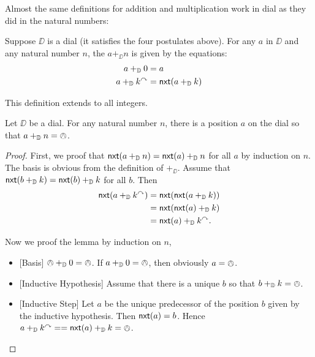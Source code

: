 Almost the same definitions for addition and multiplication work in dial as they did in the natural numbers:

\begin{defn}
	Suppose $\DD$ is a dial (it satisfies the four postulates above). For any $a$ in $\DD$ and any natural number $n$, the  $a+_\DD n$ is given by the equations:
	\begin{align*}
		a +_{\mathbb D} 0 &= a\\
		a +_{\mathbb D} k^\curvearrowright &= {\mathord{\textsf{nxt}}}(a+_{\mathbb D} k)
	\end{align*}
\end{defn}

This definition extends to all integers.

\begin{lem}
	Let $\DD$ be a dial.
	For any natural number $n$, there is a position $a$ on the dial so that $a+_{\mathbb D} n = \owedge$.
	
	\begin{proof}
		First, we proof that ${\mathord{\textsf{nxt}}}(a +_{\mathbb D} n) = {\mathord{\textsf{nxt}}}(a) +_{\mathbb D} n$ for all $a$ by induction on $n$. The basis is obvious from the definition of $+_\DD$. Assume that ${\mathord{\textsf{nxt}}}(b +_{\mathbb D} k) = {\mathord{\textsf{nxt}}}(b) +_{\mathbb D} k$ for all $b$. Then 
		\begin{align*}
		{\mathord{\textsf{nxt}}}(a +_{\mathbb D} k^\curvearrowright) &= {\mathord{\textsf{nxt}}}({\mathord{\textsf{nxt}}}(a+_{\mathbb D} k))\\
		                    &= {\mathord{\textsf{nxt}}}({\mathord{\textsf{nxt}}}(a) +_{\mathbb D} k)\\
		                    &= {\mathord{\textsf{nxt}}}(a) +_{\mathbb D} k^\curvearrowright.
		\end{align*}
		
		Now we proof the lemma by induction on $n$,
		\begin{itemize}
			\item{}[Basis] $\owedge +_{\mathbb D} 0 = \owedge$. If $a +_{\mathbb D} 0 = \owedge$, then obviously $a=\owedge$.
			\item{}[Inductive Hypothesis] Assume that there is a unique $b$ so that $b +_{\mathbb D} k = \owedge$.
			\item{}[Inductive Step] Let $a$ be the unique predecessor of the position $b$ given by the inductive hypothesis. Then ${\mathord{\textsf{nxt}}}(a)=b$. Hence $a +_{\mathbb D} k^\curvearrowright = = {\mathord{\textsf{nxt}}}(a) +_{\mathbb D} k = \owedge$. 
		\end{itemize}
	\end{proof}
\end{lem}


